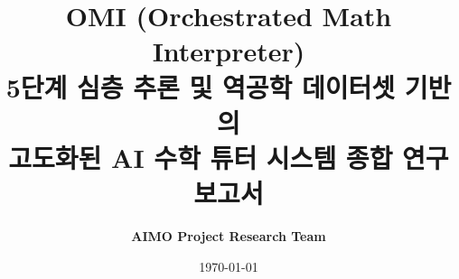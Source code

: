 \documentclass[11pt,a4paper]{article}
\title{\Huge\textbf{OMI (Orchestrated Math Interpreter)} \\ \vspace{0.8cm} \Large 5단계 심층 추론 및 역공학 데이터셋 기반의 \\ 고도화된 AI 수학 튜터 시스템 종합 연구 보고서}
\author{\textbf{AIMO Project Research Team}}
\date{\today}
\begin{document}
\maketitle

\begin{abstract}

\end{abstract}

\newpage
\tableofcontents
\newpage


\newpage

\newpage

\newpage

\newpage

\end{document}
